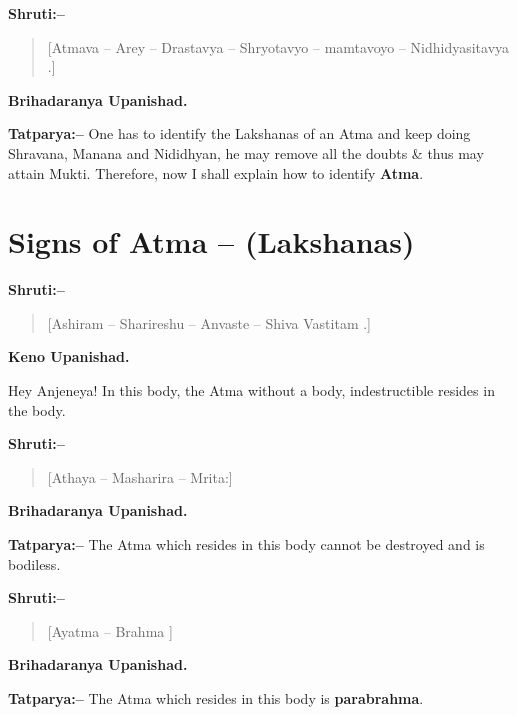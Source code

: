 \textbf{Shruti:–}

\begin{verse}
[Atmava – Arey – Drastavya – Shryotavyo – mamtavoyo – Nidhidyasitavya .]
\end{verse}

\begin{flushright}
\textbf{Brihadaranya Upanishad.}
\end{flushright}

\textbf{Tatparya:–} One has to identify the Lakshanas of an Atma and keep doing Shravana, Manana and Nididhyan, he may remove all the doubts \& thus may attain Mukti. Therefore, now I shall explain how to identify \textbf{Atma}.

\chapter{Signs of Atma – (Lakshanas)}

\textbf{Shruti:–}

\begin{verse}
[Ashiram – Sharireshu – Anvaste – Shiva Vastitam .]
\end{verse}

\begin{flushright}
\textbf{Keno Upanishad.}
\end{flushright}

Hey Anjeneya! In this body, the Atma without a body, indestructible resides in the body.

\textbf{Shruti:–}

\begin{verse}
[Athaya – Masharira – Mrita:]
\end{verse}

\begin{flushright}
\textbf{Brihadaranya Upanishad.}
\end{flushright}

\textbf{Tatparya:–} The Atma which resides in this body cannot be destroyed and is bodiless.

\textbf{Shruti:–}

\begin{verse}
[Ayatma – Brahma ]
\end{verse}

\begin{flushright}
\textbf{Brihadaranya Upanishad.}
\end{flushright}

\textbf{Tatparya:–} The Atma which resides in this body is \textbf{parabrahma}.

